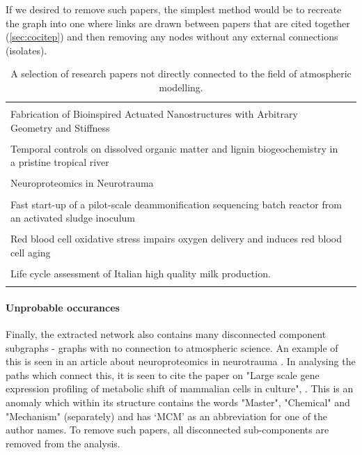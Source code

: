  If we desired to remove such papers, the simplest method would be to recreate the graph into one where links are drawn between papers that are cited together (\autoref{sec:cocitep})
 and then removing any nodes without any external connections (isolates).

\begin{table}[H]
\begin{center}
\begin{tabular}{ p{}|l }
 \hline
   & \\
 Fabrication of Bioinspired Actuated Nanostructures with Arbitrary Geometry and Stiffness & \citep{nano} \\ \\
 Temporal controls on dissolved organic matter and lignin biogeochemistry in a pristine tropical river  & \citep{biogeo} \\ \\
Neuroproteomics in Neurotrauma & \citep{neurotrauma}\\ \\
%
Fast start-up of a pilot-scale deammonification sequencing batch reactor from an activated sludge inoculum & \citep{pilot} \\ \\
Red blood cell oxidative stress impairs oxygen  delivery and induces red blood cell aging & \citep{blood} \\ \\
%
Life cycle assessment of Italian high quality milk production. & \citep{milk}\\ \\
%
 \hline
\end{tabular}
\end{center}
\label{table:otherpapers}
\caption{A selection of research papers not directly connected to the field of atmospheric modelling.}
\end{table}



\paragraph*{Unprobable occurances}
Finally, the extracted network also contains many disconnected component subgraphs - graphs with no connection to atmospheric science. An example of this is seen in an article about neuroproteomics in neurotrauma \citep{neurotrauma}. In analysing the paths which connect this, it is seen to cite the paper on "Large scale gene expression profiling of metabolic shift of mammalian cells in culture", \citep{neuro2}. This is an anomaly which within its structure contains the words "Master", "Chemical" and "Mechanism" (separately) and has `MCM' as an abbreviation for one of the author names. To remove such papers, all disconnected sub-components are removed from the analysis. 



